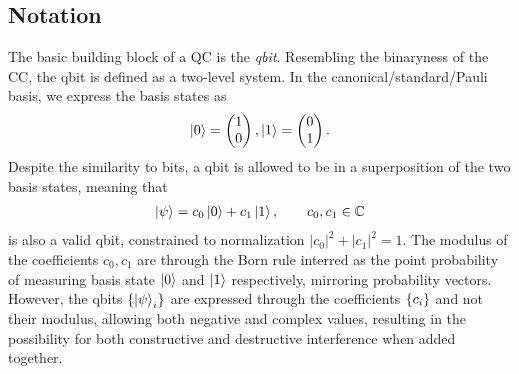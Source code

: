 \subsection{Notation}
The basic building block of a QC is the \textit{qbit}. Resembling the binaryness  of the CC, the qbit is defined as a two-level system. In the canonical/standard/Pauli basis, we express the basis states as
\begin{align*}
    \ket{0} = \begin{pmatrix}
        1 \\
        0
    \end{pmatrix}, \ket{1} = \begin{pmatrix}
        0 \\ 
        1
    \end{pmatrix}.
\end{align*}
Despite the similarity to bits, a qbit is allowed to be in a superposition of the two basis states, meaning that 
\begin{align*}
    \ket{\psi} = c_0 \ket{0} + c_1 \ket{1}, \hspace{20px} c_0,c_1 \in \mathbb{C}
\end{align*}
is also a valid qbit, constrained to normalization $|c_0|^2 + |c_1|^2 = 1$. The modulus of the coefficients $c_0,c_1$ are through the Born rule interred as the point probability of measuring basis state $\ket{0}$ and $\ket{1}$ respectively, mirroring probability vectors. However, the qbits $\{\ket{\psi}_i\}$ are expressed through the coefficients $\{c_i\}$ and not their modulus, allowing both negative and complex values, resulting in the possibility for both constructive and destructive interference when added together.

